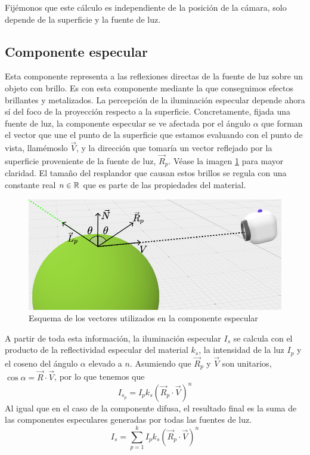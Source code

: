 Fijémonos que este cálculo es independiente de la posición de la cámara, solo depende de la superficie y la fuente de luz.

\subsection{Componente especular}

Esta componente representa a las reflexiones directas de la fuente de luz sobre un objeto con brillo. Es con esta componente mediante la que conseguimos efectos brillantes y metalizados. La percepción de la iluminación especular depende ahora sí del foco de la proyección respecto a la superficie. Concretamente, fijada una fuente de luz, la componente especular se ve afectada por el ángulo $\alpha$ que forman el vector que une el punto de la superficie que estamos evaluando con el punto de vista, llamémoslo  $\vec V$, y la dirección que tomaría un vector reflejado por la superficie proveniente de la fuente de luz, $\vec R_p$. Véase la imagen \ref{fig:especular} para mayor claridad. El tamaño del resplandor que causan estos brillos se regula con una constante real $n\in\mathbb{R}$ que es parte de las propiedades del material.

\begin{figure} [ht]
    \centering
    \includegraphics[scale = 0.35]{img/C7/especular.png}
    \caption{Esquema de los vectores utilizados en la componente especular}
    \label{fig:especular}
\end{figure}

A partir de toda esta información, la iluminación especular $I_s$ se calcula con el producto de la reflectividad especular del material $k_s$, la intensidad de la luz $I_p$ y el coseno del ángulo $\alpha$ elevado a $n$. Asumiendo que $\vec R_p$ y $\vec V$ son unitarios, $\cos\alpha=\vec R\cdot \vec V$, por lo que tenemos que
\begin{equation}
    I_{s_p} = I_p k_s (\vec R_p\cdot \vec V)^n
\end{equation}   
Al igual que en el caso de la componente difusa, el resultado final es la suma de las componentes especulares generadas por todas las fuentes de luz.
\begin{equation}
    I_s = \sum_{p=1}^k I_p k_s (\vec R_p \cdot \vec V)^n
\end{equation}

